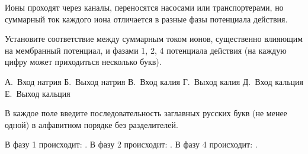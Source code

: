 
Ионы проходят через каналы, переносятся насосами или транспортерами, но суммарный ток каждого иона отличается в разные фазы потенциала действия.

Установите соответствие между суммарным током ионов, существенно влияющим на мембранный потенциал, и фазами 1, 2, 4 потенциала действия (на каждую цифру может приходиться несколько букв).



А. Вход натрия
Б. Выход натрия
В. Вход калия
Г. Выход калия
Д. Вход кальция
Е. Выход кальция

В каждое поле введите последовательность заглавных русских букв (не менее одной) в алфавитном порядке без разделителей.

В фазу 1 происходит: \underline{\hspace{2in}}. В фазу 2 происходит: \underline{\hspace{2in}}. В фазу 4 происходит: \underline{\hspace{2in}}.